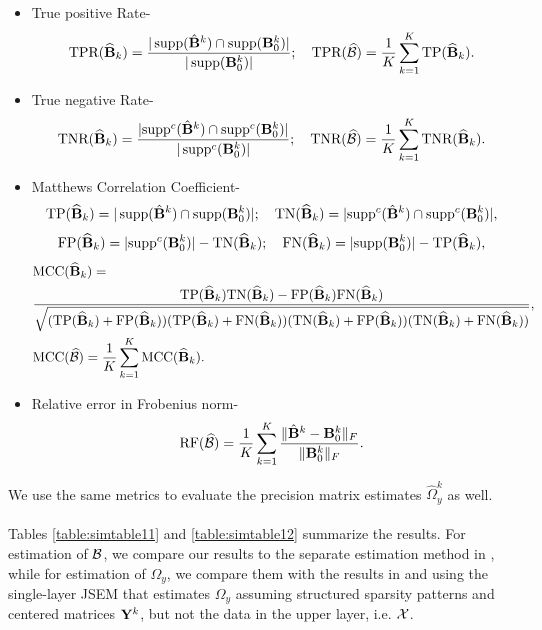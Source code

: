 \begin{itemize}
\item True positive Rate-
%
\[
\text{TPR}(\widehat {{\mathbf{B}}}_k) = \frac{| \operatorname*{supp}(\hat {{\mathbf{B}}}^k) \cap \operatorname*{supp} ({\mathbf{B}}_0^k)|}{| \operatorname*{supp} ({\mathbf{B}}_0^k)|}; \quad
\text{TPR} (\widehat {{\cal{B}}}) = \frac{1}{K} \sum_{k=1}^K \text{TP}(\widehat {{\mathbf{B}}}_k).
\]
\item True negative Rate-
%
\[
\text{TNR}(\widehat {{\mathbf{B}}}_k) = \frac{| {\operatorname*{supp}}^c (\hat {{\mathbf{B}}}^k) \cap {\operatorname*{supp}}^c ({\mathbf{B}}_0^k)|}{| \operatorname*{supp}^c ({\mathbf{B}}_0^k)|}; \quad
\text{TNR} (\widehat {{\cal{B}}}) = \frac{1}{K} \sum_{k=1}^K \text{TNR}(\widehat {{\mathbf{B}}}_k).
\]
%
\item Matthews Correlation Coefficient-
%
$$
\text{TP}(\widehat {{\mathbf{B}}}_k) = | \operatorname*{supp}(\hat {{\mathbf{B}}}^k) \cap \operatorname*{supp} ({\mathbf{B}}_0^k)|; \quad
\text{TN}(\widehat {{\mathbf{B}}}_k) = | {\operatorname*{supp}}^c (\hat {{\mathbf{B}}}^k) \cap {\operatorname*{supp}}^c ({\mathbf{B}}_0^k)|,
$$
$$
\text{FP}(\widehat {{\mathbf{B}}}_k) = | {\operatorname*{supp}}^c ({\mathbf{B}}^k_0) | - \text{TN}(\widehat {{\mathbf{B}}}_k); \quad
\text{FN}(\widehat {{\mathbf{B}}}_k) = | {\operatorname*{supp}} ({\mathbf{B}}^k_0) | - \text{TP}(\widehat {{\mathbf{B}}}_k), $$
\begin{align*}
& \text{MCC} (\widehat {{\mathbf{B}}}_k) = \\
& \frac{ \text{TP}(\widehat {{\mathbf{B}}}_k) \text{TN}(\widehat {{\mathbf{B}}}_k) -
\text{FP}(\widehat {{\mathbf{B}}}_k) \text{FN}(\widehat {{\mathbf{B}}}_k)}
{\sqrt{(\text{TP}(\widehat {{\mathbf{B}}}_k) + \text{FP}(\widehat {{\mathbf{B}}}_k))
(\text{TP}(\widehat {{\mathbf{B}}}_k) + \text{FN}(\widehat {{\mathbf{B}}}_k))
(\text{TN}(\widehat {{\mathbf{B}}}_k) + \text{FP}(\widehat {{\mathbf{B}}}_k))
(\text{TN}(\widehat {{\mathbf{B}}}_k) + \text{FN}(\widehat {{\mathbf{B}}}_k)) }}, \\
& \text{MCC} (\widehat {{\cal{B}}}) = \frac{1}{K} \sum_{k=1}^K \text{MCC}(\widehat {{\mathbf{B}}}_k).
\end{align*}
%
\item Relative error in Frobenius norm-
%
\[
\text{RF} (\widehat {{\cal{B}}}) = \frac{1}{K} \sum_{k=1}^K \frac{\| \hat {{\mathbf{B}}}^k - {\mathbf{B}}_0^k \|_F}{\| {\mathbf{B}}_0^k \|_F}.
\]
%
\end{itemize}
%
We use the same metrics to evaluate the precision matrix estimates $\widehat \Omega_y^k$ as well.

\paragraph{}
Tables \ref{table:simtable11} and \ref{table:simtable12} summarize the results. For estimation of ${\cal{B}}$, we compare our results to the separate estimation method in \cite{LinEtal16}, while for estimation of $\Omega_y$, we compare them with the results in \cite{LinEtal16} and using the single-layer JSEM \cite{MaMichailidis15} that estimates $\Omega_y$ assuming structured sparsity patterns and centered matrices ${\mathbf{Y}}^k$, but not the data in the upper layer, i.e. ${\cal{X}}$.

